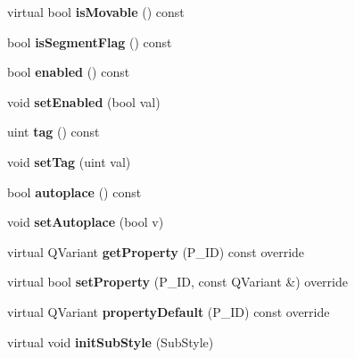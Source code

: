 \begin{DoxyCompactItemize}
virtual bool {\bfseries is\+Movable} () const
\item 
\mbox{\label{class_ms_1_1_element_a9c371f80fb0c8170ba7c54dd22e52ca6}} 
bool {\bfseries is\+Segment\+Flag} () const
\item 
\mbox{\label{class_ms_1_1_element_adbcd81f12f80859fdaf2ca1bd24d23d1}} 
bool {\bfseries enabled} () const
\item 
\mbox{\label{class_ms_1_1_element_ab75c49bf26fcb549bd1959ffe7925d8b}} 
void {\bfseries set\+Enabled} (bool val)
\item 
\mbox{\label{class_ms_1_1_element_a31f5e22d38f84ff52c512857c52dd668}} 
uint {\bfseries tag} () const
\item 
\mbox{\label{class_ms_1_1_element_a9b433e4368d19bc18b9d8cb4c41fe1d4}} 
void {\bfseries set\+Tag} (uint val)
\item 
\mbox{\label{class_ms_1_1_element_a36da6a07a74436d96c739f7134873eda}} 
bool {\bfseries autoplace} () const
\item 
\mbox{\label{class_ms_1_1_element_ac84d802724c43c8dcec941e8c259ebca}} 
void {\bfseries set\+Autoplace} (bool v)
\item 
\mbox{\label{class_ms_1_1_element_af805ffa43e16423754b0b7d0bbe0bb45}} 
virtual Q\+Variant {\bfseries get\+Property} (P\+\_\+\+ID) const override
\item 
\mbox{\label{class_ms_1_1_element_a2fb5f247f7ebb47ec9bc6459bb7768ec}} 
virtual bool {\bfseries set\+Property} (P\+\_\+\+ID, const Q\+Variant \&) override
\item 
\mbox{\label{class_ms_1_1_element_ad15189534609cea38f8d688178dbad07}} 
virtual Q\+Variant {\bfseries property\+Default} (P\+\_\+\+ID) const override
\item 
\mbox{\label{class_ms_1_1_element_affda693d2a03d79c80b363f66a1283c6}} 
virtual void {\bfseries init\+Sub\+Style} (Sub\+Style)

\end{DoxyCompactItemize}
